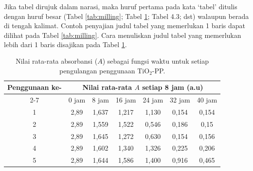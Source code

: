 Jika tabel dirujuk dalam narasi, maka huruf pertama pada kata ‘tabel’ ditulis dengan huruf besar (Tabel \ref{tab:milling}; Tabel \ref{tab:absorbansi}; Tabel 4.3; dst) walaupun berada di tengah kalimat. Contoh penyajian judul tabel yang memerlukan 1 baris dapat dilihat pada Tabel \ref{tab:milling}. Cara menuliskan judul tabel yang memerlukan lebih dari 1 baris disajikan pada Tabel \ref{tab:absorbansi}.

\begin{table}[htbp]
    \centering
    \caption{Nilai rata-rata absorbansi ($A$) sebagai fungsi waktu untuk setiap pengulangan penggunaan TiO$_2$-PP.}
    \begin{tabular}{ccccccc}
        \toprule
        Penggunaan ke- & \multicolumn{6}{c}{Nilai rata-rata $A$ setiap 8 jam (a.u)} \\
        \cmidrule(lr){2-7}
        & 0 jam & 8 jam & 16 jam & 24 jam & 32 jam & 40 jam \\
        \midrule
        1 & 2,89 & 1,637 & 1,217 & 1,130 & 0,154 & 0,154 \\
        2 & 2,89 & 1,559 & 1,522 & 0,546 & 0,186 & 0,15 \\
        3 & 2,89 & 1,645 & 1,272 & 0,630 & 0,154 & 0,156 \\
        4 & 2,89 & 1,602 & 1,340 & 1,326 & 0,225 & 0,206 \\
        5 & 2,89 & 1,644 & 1,586 & 1,400 & 0,916 & 0,465 \\
        \bottomrule
    \end{tabular}
    \label{tab:absorbansi}
\end{table}
